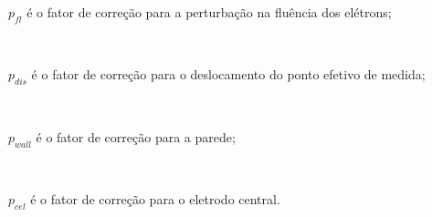 \documentclass[11pt,a4paper]{article}
\newcounter{exemplo}
\begin{document}
			\begin{exemplo}
				$p_{fl}$ é o fator de correção para a perturbação na fluência dos elétrons; 

				\

				$p_{dis}$ é o fator de correção para o deslocamento do ponto efetivo de medida;

				\

				$p_{wall}$ é o fator de correção para a parede;

				\

				$p_{cel}$ é o fator de correção para o eletrodo central.
			\end{exemplo}












  
\end{document}
